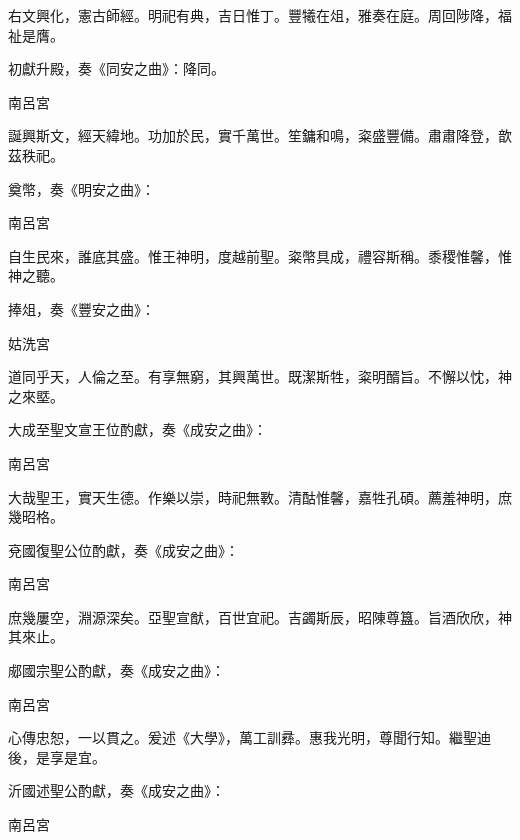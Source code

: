 \begin{pinyinscope}
 右文興化，憲古師經。明祀有典，吉日惟丁。豐犧在俎，雅奏在庭。周回陟降，福祉是膺。



 初獻升殿，奏《同安之曲》：降同。



 南呂宮



 誕興斯文，經天緯地。功加於民，實千萬世。笙鏞和鳴，粢盛豐備。肅肅降登，歆茲秩祀。



 奠幣，奏《明安之曲》：



 南呂宮



 自生民來，誰底其盛。惟王神明，度越前聖。粢幣具成，禮容斯稱。黍稷惟馨，惟神之聽。



 捧俎，奏《豐安之曲》：



 姑洗宮



 道同乎天，人倫之至。有享無窮，其興萬世。既潔斯牲，粢明醑旨。不懈以忱，神之來塈。



 大成至聖文宣王位酌獻，奏《成安之曲》：



 南呂宮



 大哉聖王，實天生德。作樂以崇，時祀無斁。清酤惟馨，嘉牲孔碩。薦羞神明，庶幾昭格。



 兗國復聖公位酌獻，奏《成安之曲》：



 南呂宮



 庶幾屢空，淵源深矣。亞聖宣猷，百世宜祀。吉蠲斯辰，昭陳尊簋。旨酒欣欣，神其來止。



 郕國宗聖公酌獻，奏《成安之曲》：



 南呂宮



 心傳忠恕，一以貫之。爰述《大學》，萬工訓彞。惠我光明，尊聞行知。繼聖迪後，是享是宜。



 沂國述聖公酌獻，奏《成安之曲》：



 南呂宮




\end{pinyinscope}
